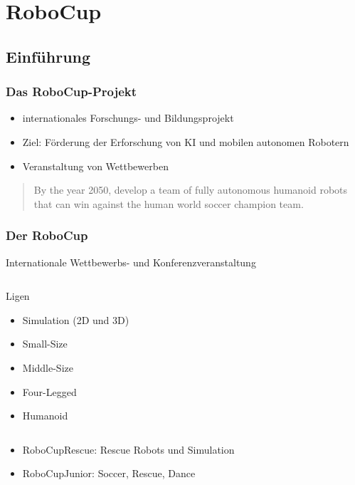 \section{RoboCup}
\subsection{Einführung}
\begin{frame}
  \frametitle{Das RoboCup-Projekt}
  
  \begin{itemize}
    \item internationales Forschungs- und Bildungsprojekt
    \item Ziel: Förderung der Erforschung von KI und mobilen autonomen Robotern
    \item Veranstaltung von Wettbewerben
  \end{itemize}
  
  \begin{quote}
  By the year 2050, develop a team of fully autonomous humanoid robots that
  can win against the human world soccer champion team.
  \end{quote}
\end{frame}

\begin{frame}
  \frametitle{Der RoboCup}
  Internationale Wettbewerbs- und Konferenzveranstaltung

  \begin{columns}[b]
    \begin{block}{Ligen}
      \begin{itemize}
        \item Simulation (2D und 3D)
        \item Small-Size
        \item Middle-Size
        \item Four-Legged
        \item Humanoid
      \end{itemize}
    \end{block}
    
  \end{columns}
  
  \begin{itemize}
    \item RoboCupRescue: Rescue Robots und Simulation
    \item RoboCupJunior: Soccer, Rescue, Dance
  \end{itemize}
\end{frame}

